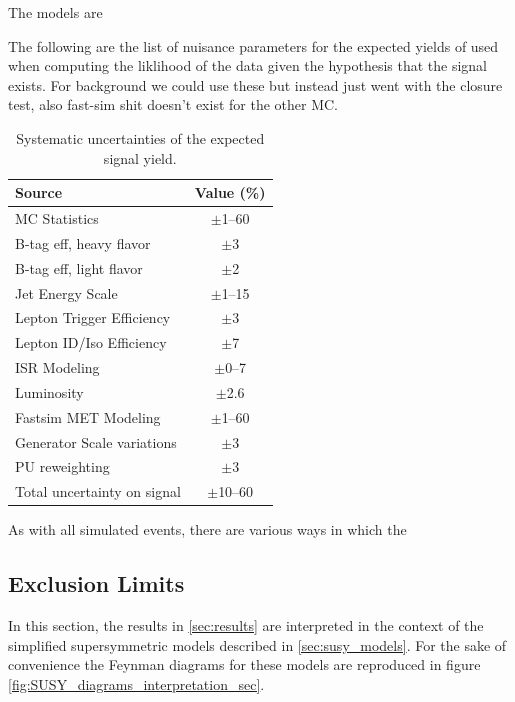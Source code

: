     The models are 

    The following are the list of nuisance parameters for the expected yields of used when computing the liklihood of the data given the hypothesis that the signal exists. For background we could use these but instead just went with the closure test, also fast-sim shit doesn't exist for the other MC.

    \begin{table}[htb]
      \begin{center}
        \footnotesize
        \caption{\label{tab:syst} Systematic uncertainties of the expected signal yield. }
        \begin{tabular}{l|c}
          \hline
          \hline
          Source                     & Value (\%) \\
          \hline
          MC Statistics              & $\pm$1--60 \\
          B-tag eff, heavy flavor    & $\pm$3    \\
          B-tag eff, light flavor    & $\pm$2    \\
          Jet Energy Scale           & $\pm$1--15  \\
          Lepton Trigger Efficiency  & $\pm$3    \\
          Lepton ID/Iso Efficiency   & $\pm$7    \\
          ISR Modeling               & $\pm$0--7  \\
          Luminosity                 & $\pm$2.6  \\
          Fastsim MET Modeling       & $\pm$1--60    \\
          Generator Scale variations & $\pm$3   \\
          PU reweighting             & $\pm$3    \\
          \hline
          Total uncertainty on signal& $\pm$10--60 \\
          \hline
          \hline
        \end{tabular}
      \end{center}
    \end{table}

    As with all simulated events, there are various ways in which the 

  \subsection{Exclusion Limits}

    In this section, the results in \ref{sec:results} are interpreted in the context of the simplified supersymmetric models described in \ref{sec:susy_models}. For the sake of convenience the Feynman diagrams for these models are reproduced in figure \ref{fig:SUSY_diagrams_interpretation_sec}.

